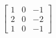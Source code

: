 \documentclass[preview]{standalone}
\begin{document}
\begin{align*}
\begin{bmatrix} 1 & 0 & -1 \\ 2 & 0 & -2 \\ 1 & 0 & -1 \end{bmatrix}
\end{align*}
\end{document}
